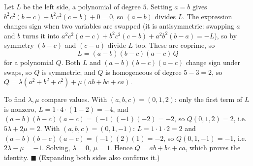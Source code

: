 Let $L$ be the left side, a polynomial of degree $5$. Setting $a=b$ gives $b^2c^2(b-c)+b^2c^2(c-b)+0=0$, so $(a-b)$ divides $L$. The expression changes sign when two variables are swapped (it is antisymmetric: swapping $a$ and $b$ turns it into $a^2c^2(a-c)+b^2c^2(c-b)+a^2b^2(b-a)=-L$), so by symmetry $(b-c)$ and $(c-a)$ divide $L$ too. These are coprime, so
\[
L=(a-b)(b-c)(a-c)\,Q
\]
for a polynomial $Q$. Both $L$ and $(a-b)(b-c)(a-c)$ change sign under swaps, so $Q$ is symmetric; and $Q$ is homogeneous of degree $5-3=2$, so $Q=\lambda(a^2+b^2+c^2)+\mu(ab+bc+ca)$.

To find $\lambda,\mu$ compare values. With $(a,b,c)=(0,1,2)$: only the first term of $L$ is nonzero, $L=1\cdot4\cdot(1-2)=-4$, and $(a-b)(b-c)(a-c)=(-1)(-1)(-2)=-2$, so $Q(0,1,2)=2$, i.e. $5\lambda+2\mu=2$. With $(a,b,c)=(0,1,-1)$: $L=1\cdot1\cdot2=2$ and $(a-b)(b-c)(a-c)=(-1)(2)(1)=-2$, so $Q(0,1,-1)=-1$, i.e. $2\lambda-\mu=-1$. Solving, $\lambda=0$, $\mu=1$. Hence $Q=ab+bc+ca$, which proves the identity. $\blacksquare$ (Expanding both sides also confirms it.)
